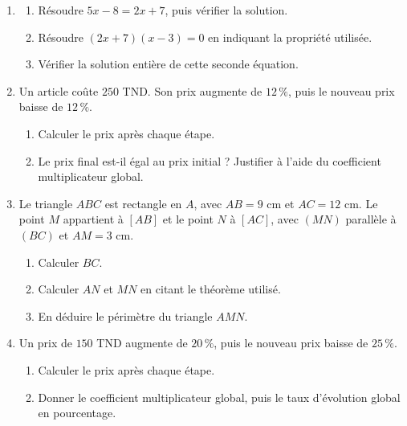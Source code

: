 \documentclass[10pt,a4paper]{article}
\begin{document}
\begin{enumerate}
\needspace{22mm}
\item[\textbf{B1.}] \begin{enumerate}
\item Résoudre $5x - 8 = 2x + 7$, puis vérifier la solution.
\item Résoudre $(2x + 7)(x - 3) = 0$ en indiquant la propriété utilisée.
\item Vérifier la solution entière de cette seconde équation.
\end{enumerate}
\par\vspace{1.2mm}
\needspace{22mm}
\item[\textbf{B2.}] Un article coûte $250$ TND. Son prix augmente de $12\,\%$, puis le nouveau prix baisse de $12\,\%$.
\begin{enumerate}
\item Calculer le prix après chaque étape.
\item Le prix final est-il égal au prix initial ? Justifier à l'aide du coefficient multiplicateur global.
\end{enumerate}
\par\vspace{1.2mm}
\needspace{22mm}
\item[\textbf{B3.}] Le triangle $ABC$ est rectangle en $A$, avec $AB = 9$ cm et $AC = 12$ cm.
Le point $M$ appartient à $[AB]$ et le point $N$ à $[AC]$, avec $(MN)$ parallèle à $(BC)$ et $AM = 3$ cm.
\begin{enumerate}
\item Calculer $BC$.
\item Calculer $AN$ et $MN$ en citant le théorème utilisé.
\item En déduire le périmètre du triangle $AMN$.
\end{enumerate}
\par\vspace{1.2mm}
\needspace{22mm}
\item[\textbf{B4.}] Un prix de $150$ TND augmente de $20\,\%$, puis le nouveau prix baisse de $25\,\%$.
\begin{enumerate}
\item Calculer le prix après chaque étape.
\item Donner le coefficient multiplicateur global, puis le taux d'évolution global en pourcentage.
\end{enumerate}
\par\vspace{1.2mm}
\end{enumerate}
\end{document}
